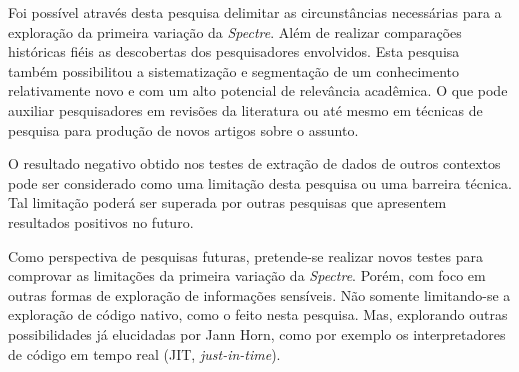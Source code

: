 \documentclass[
	article,			    %
	12pt,				    %
	oneside,			    %
	a4paper,			    %
	chapter=TITLE,		    %
	section=TITLE,		    %
	subsection=TITLE,	    %
	english,			    %
	brazil,				    %
	sumario=tradicional
]{abntex2}
\begin{document}
Foi possível através desta pesquisa delimitar as circunstâncias necessárias para a exploração da primeira variação da \emph{Spectre}. Além de realizar comparações históricas fiéis as descobertas dos pesquisadores envolvidos. Esta pesquisa também possibilitou a sistematização e segmentação de um conhecimento relativamente novo e com um alto potencial de relevância acadêmica. O que pode auxiliar pesquisadores em revisões da literatura ou até mesmo em técnicas de pesquisa para produção de novos artigos sobre o assunto.

O resultado negativo obtido nos testes de extração de dados de outros contextos pode ser considerado
como uma limitação desta pesquisa ou uma barreira técnica. Tal limitação poderá ser superada por
outras pesquisas que apresentem resultados positivos no futuro.

Como perspectiva de pesquisas futuras, pretende-se realizar novos testes para comprovar as limitações da primeira variação da \emph{Spectre}. Porém, com foco em outras formas de exploração de informações sensíveis. Não somente limitando-se a exploração de código nativo, como o feito nesta pesquisa. Mas, explorando outras possibilidades já elucidadas por Jann Horn, como por exemplo os interpretadores de código em tempo real (JIT, \emph{just-in-time}).
\end{document}
